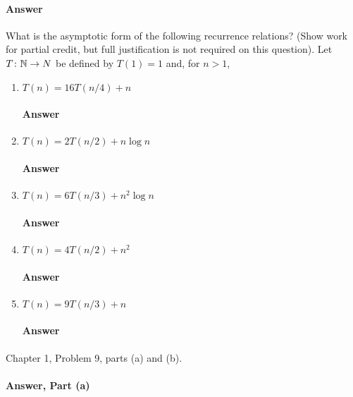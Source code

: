 \documentclass{article}
\begin{document}
\paragraph{Answer}
\todo{}


\collab{\todo{}}

What is the asymptotic form of the following recurrence
relations? (Show work for partial credit, but full justification is not required
on this question).
Let $T \colon {\mathbb N} \to N$ be defined by $T(1)=1$ and, for $n>1$,
\begin{enumerate}
      \item $T(n) = 16 T(n/4) + n$
            \paragraph{Answer} \todo{}
      \item $T(n) = 2 T(n/2) + n \log{n}$
            \paragraph{Answer} \todo{}
      \item $T(n) = 6 T(n/3) + n^2 \log{n}$
            \paragraph{Answer} \todo{}
      \item $T(n) = 4 T(n/2) + n^2$
            \paragraph{Answer} \todo{}
      \item $T(n) = 9 T(n/3) + n$
            \paragraph{Answer} \todo{}
\end{enumerate}


\collab{\todo{}}

Chapter 1, Problem 9, parts (a) and (b).

\paragraph{Answer, Part (a)}
\end{document}
